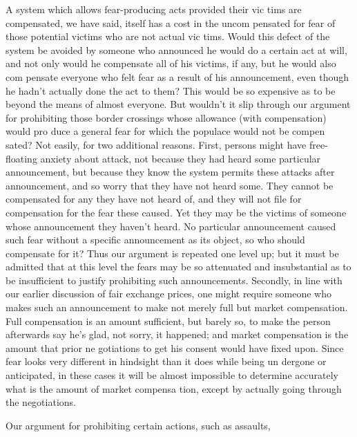 \documentclass[11pt,openany]{book}
\begin{document}
A system which allows fear-producing acts provided their vic tims are compensated, we have said, itself has a cost in the uncom pensated for fear of those potential victims who are not actual vic tims. Would this defect of the system be avoided by someone who announced he would do a certain act at will, and not only would he compensate all of his victims, if any, but he would also com pensate everyone who felt fear as a result of his announcement, even though he hadn't actually done the act to them? This would be so expensive as to be beyond the means of almost everyone. But wouldn't it slip through our argument for prohibiting those border crossings whose allowance (with compensation) would pro duce a general fear for which the populace would not be compen sated? Not easily, for two additional reasons. First, persons might have free-floating anxiety about attack, not because they had heard some particular announcement, but because they know the system permits these attacks after announcement, and so worry that they have not heard some. They cannot be compensated for any they have not heard of, and they will not file for compensation for the fear these caused. Yet they may be the victims of someone whose announcement they haven't heard. No particular announcement caused such fear without a specific announcement as its object, so who should compensate for it? Thus our argument is repeated one level up; but it must be admitted that at this level the fears may be so attenuated and insubstantial as to be insufficient to justify prohibiting such announcements. Secondly, in line with our earlier discussion of fair exchange prices, one might require someone who makes such an announcement to make not merely full but market compensation. Full compensation is an amount sufficient, but barely so, to make the person afterwards say he's glad, not sorry, it happened; and market compensation is the amount that prior ne gotiations to get his consent would have fixed upon. Since fear looks very different in hindsight than it does while being un dergone or anticipated, in these cases it will be almost impossible to determine accurately what is the amount of market compensa tion, except by actually going through the negotiations. 

Our argument for prohibiting certain actions, such as assaults, 
\end{document}
